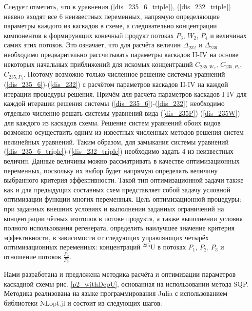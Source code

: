 Следует отметить, что в уравнения (\ref{dis_235_6_triple}), (\ref{dis_232_triple}) неявно входят все 6 неизвестных переменных, напрямую определяющие параметры каждого из каскадов в схеме, а следовательно концентрации компонентов в формирующих конечный продукт потоках $P_3$, $W_2$, $P_4$ и величинах самих этих потоков. Это означает, что для расчёта величин $\Delta_{232}$ и $\Delta_{236}$ необходимо предварительно рассчитывать параметры каскадов II-IV на основе некоторых начальных приближений для искомых концентраций $C_{235,{W_2}}$, $C_{235,{P_3}}$, $C_{235,{P_4}}$. Поэтому возможно только численное решение системы уравнений (\ref{dis_235_6})-(\ref{dis_232}) с расчётом параметров каскадов II-IV на каждой итерации процедуры решения. Причём для расчета параметров каскадов I-IV для каждой итерации решения системы (\ref{dis_235_6})-(\ref{dis_232}) необходимо отдельно численно решать системы уравнений вида (\ref{dis_235P})-(\ref{dis_235W}) для каждого из каскадов схемы. Решение систем уравнений обоих видов возможно осуществить одним из известных численных методов решения систем нелинейных уравнений. Таким образом, для замыкания системы уравнений (\ref{dis_235_6_triple})-(\ref{dis_232_triple}) необходимо задать 4 из неизвестных величин. Данные величины можно рассматривать в качестве оптимизационных переменных, поскольку их выбор будет напрямую определять величину выбранного критерия эффективности. Такой тип оптимизационной задачи также как и для предыдущих составных схем представляет собой задачу условной оптимизации функции многих переменных. Цель оптимизационной процедуры: при заданных внешних условиях и выполнении заданных ограничений на концентрации чётных изотопов в потоке продукта, а также выполнении условия полного использования регенерата, определить наилучшее значение критерия эффективности, в зависимости от следующих управляющих четырёх оптимизационных переменных: концентраций $^{235}$U в потоках $P_1$, $P_2$, $P_3$ и отношение потоков $\frac{P_{2}}{F_3}$. 

Нами разработана и предложена методика расчёта и оптимизации параметров каскадной схемы рис. \ref{p2_withDepU}, основанная на использовании метода SQP.
Методика реализована на языке программирования Julia с использованием библиотеки NLopt.jl \cite{NLopt} и состоит из следующих шагов:

